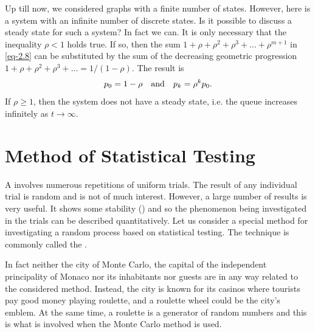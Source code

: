 Up till now, we considered graphs with a finite number of states. However, here is a system with an infinite number of discrete states. Is it possible to discuss a steady state for such a system? In fact we can. It is only necessary that the inequality $\rho < 1$ holds true. If so, then the sum
$1 + \rho+ \rho^{2}+ \rho^{3}+ \ldots{} + \rho^{m+1}$ in \eqref{eq-2.8} can be substituted by the sum of the decreasing geometric progression $1 + \rho+ \rho^{2}+ \rho^{3}+ \ldots{}  = 1/(1 - \rho)$. The result is
\begin{equation}%
p_{0} = 1 - \rho  \qand  p_{k} = \rho^{k} p_{0}.
\label{eq-2.9}
\end{equation}
If $\rho \geqslant 1$, then the system does not have a steady state, i.e. the queue increases infinitely as $t \to \infty$.

\section{Method of Statistical Testing}

A  involves numerous repetitions of uniform trials. The
result of any individual trial is random and is not of much interest.
However, a large number of results is very useful. It shows some
stability () and so the phenomenon being investigated
in the trials can be described quantitatively. Let us consider a special
method for investigating a random process based on statistical testing.
The technique is commonly called the .

In fact neither the city of Monte Carlo, the capital of the independent
principality of Monaco nor its inhabitants nor guests are in any way
related to the considered method. Instead, the city is known for its
casinos where tourists pay good money playing roulette, and a roulette
wheel could be the city's emblem. At the same time, a roulette is
a generator of random numbers and this is what is involved when the
Monte Carlo method is used.


